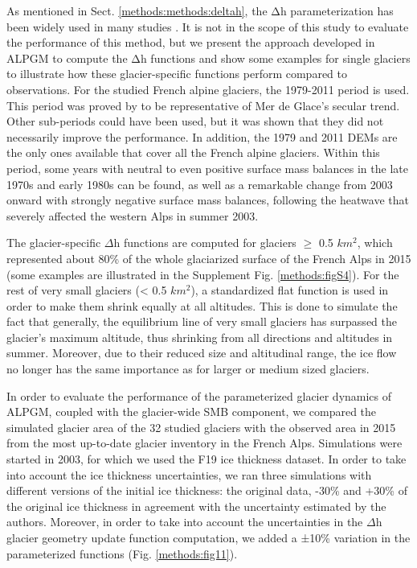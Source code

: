 As mentioned in Sect. \ref{methods:methods:deltah}, the Δh parameterization has been widely used in many studies \citep[e.g.,][]{huss_modelling_2008, huss_future_2010, vincent_future_2014, huss_new_2015, huss_global-scale_2018, hanzer_projected_2018, vincent_declin_2019}. It is not in the scope of this study to evaluate the performance of this method, but we present the approach developed in ALPGM to compute the Δh functions and show some examples for single glaciers to illustrate how these glacier-specific functions perform compared to observations. For the studied French alpine glaciers, the 1979-2011 period is used. This period was proved by \citet{vincent_future_2014} to be representative of Mer de Glace’s secular trend. Other sub-periods could have been used, but it was shown that they did not necessarily improve the performance. In addition, the 1979 and 2011 DEMs are the only ones available that cover all the French alpine glaciers. Within this period, some years with neutral to even positive surface mass balances in the late 1970s and early 1980s can be found, as well as a remarkable change from 2003 onward with strongly negative surface mass balances, following the heatwave that severely affected the western Alps in summer 2003.

The glacier-specific $\Delta$h functions are computed for glaciers $\geq$ 0.5 \(km^2\), which represented about 80\% of the whole glaciarized surface of the French Alps in 2015 (some examples are illustrated in the Supplement Fig. \ref{methods:figS4}). For the rest of very small glaciers (< 0.5 \(km^2\)), a standardized flat function is used in order to make them shrink equally at all altitudes. This is done to simulate the fact that generally, the equilibrium line of very small glaciers has surpassed the glacier’s maximum altitude, thus shrinking from all directions and altitudes in summer. Moreover, due to their reduced size and altitudinal range, the ice flow no longer has the same importance as for larger or medium sized glaciers.

In order to evaluate the performance of the parameterized glacier dynamics of ALPGM, coupled with the glacier-wide SMB component, we compared the simulated glacier area of the 32 studied glaciers with the observed area in 2015 from the most up-to-date glacier inventory in the French Alps. Simulations were started in 2003, for which we used the F19 ice thickness dataset. In order to take into account the ice thickness uncertainties, we ran three simulations with different versions of the initial ice thickness: the original data, -30\% and +30\% of the original ice thickness in agreement with the uncertainty estimated by the authors. Moreover, in order to take into account the uncertainties in the $\Delta$h glacier geometry update function computation, we added a ±10\% variation in the parameterized functions (Fig. \ref{methods:fig11}).

